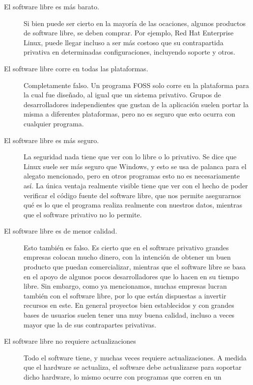 \begin{description}
    \item[El software libre es más barato.]
        Si bien puede ser cierto en la mayoría de las ocaciones, algunos
        productos de software libre, se deben comprar. Por ejemplo, Red Hat
        Enterprise Linux, puede llegar incluso a ser más costoso que su
        contrapartida privativa en determinadas configuraciones, incluyendo
        soporte y otros.
    \item[El software libre corre en todas las plataformas.]
        Completamente falso. Un programa FOSS solo corre en la plataforma para
        la cual fue diseñado, al igual que un sistema privativo. Grupos de
        desarrolladores independientes que gustan de la aplicación suelen portar
        la misma a diferentes plataformas, pero no es seguro que esto ocurra con
        cualquier programa.
    \item[El software libre es más seguro.]
        La seguridad nada tiene que ver con lo libre o lo privativo. Se dice que
        Linux suele ser más seguro que Windows, y esto se usa de palanca para el
        alegato mencionado, pero en otros programas esto no es necesariamente
        así. La única ventaja realmente visible tiene que ver con el hecho de
        poder verificar el código fuente del software libre, que nos permite
        asegurarnos qué es lo que el programa realiza realmente con nuestros
        datos, mientras que el software privativo no lo permite.
    \item[El software libre es de menor calidad.]
        Esto también es falso. Es cierto que en el software privativo grandes
        empresas colocan mucho dinero, con la intención de obtener un buen
        producto que puedan comercializar, mientras que el software libre se
        basa en el apoyo de algunos pocos desarrolladores que lo hacen en su
        tiempo libre. Sin embargo, como ya mencionamos, muchas empresas lucran
        también con el software libre, por lo que están dispuestas a invertir
        recursos en este. En general proyectos bien establecidos y con grandes
        bases de usuarios suelen tener una muy buena calidad, incluso a veces
        mayor que la de sus contrapartes privativas.
    \item[El software libre no requiere actualizaciones]
        Todo el software tiene, y muchas veces requiere actualizaciones. A
        medida que el hardware se actualiza, el software debe actualizarse para
        soportar dicho hardware, lo mismo ocurre con programas que corren en un

\end{description}
